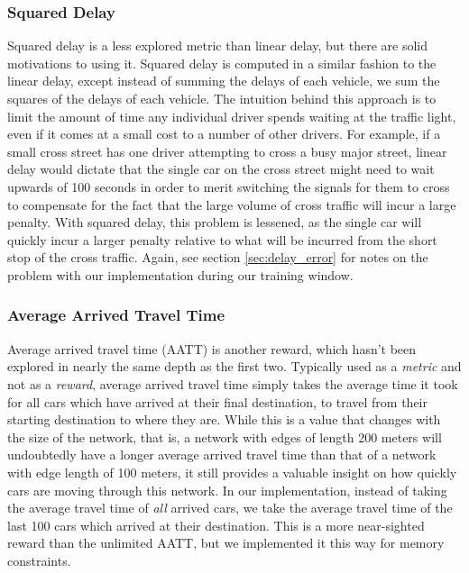 \documentclass[12pt,twocolumn]{article}
\begin{document}
\subsubsection{Squared Delay}
Squared delay is a less explored metric than linear delay, but there are solid motivations to using it. Squared delay is computed in a similar fashion to the linear delay, except instead of summing the delays of each vehicle, we sum the squares of the delays of each vehicle. The intuition behind this approach is to limit the amount of time any individual driver spends waiting at the traffic light, even if it comes at a small cost to a number of other drivers. For example, if a small cross street has one driver attempting to cross a busy major street, linear delay would dictate that the single car on the cross street might need to wait upwards of 100 seconds in order to merit switching the signals for them to cross to compensate for the fact that the large volume of cross traffic will incur a large penalty. With squared delay, this problem is lessened, as the single car will quickly incur a larger penalty relative to what will be incurred from the short stop of the cross traffic. Again, see section \ref{sec:delay_error} for notes on the problem with our implementation during our training window.

\subsubsection{Average Arrived Travel Time}
Average arrived travel time (AATT) is another reward, which hasn't been explored in nearly the same depth as the first two. Typically used as a \emph{metric} and not as a \emph{reward}, average arrived travel time simply takes the average time it took for all cars which have arrived at their final destination, to travel from their starting destination to where they are. While this is a value that changes with the size of the network, that is, a network with edges of length 200 meters will undoubtedly have a longer average arrived travel time than that of a network with edge length of 100 meters, it still provides a valuable insight on how quickly cars are moving through this network. In our implementation, instead of taking the average travel time of \emph{all} arrived cars, we take the average travel time of the last 100 cars which arrived at their destination. This is a more near-sighted reward than the unlimited AATT, but we implemented it this way for memory constraints. 
\end{document}
